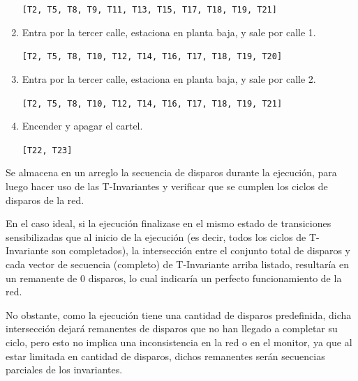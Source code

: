 \documentclass[12pt,a4paper]{article}
\begin{document}
\begin{enumerate}
    \verb|[T2, T5, T8, T9, T11, T13, T15, T17, T18, T19, T21]|
    
    \item Entra por la tercer calle, estaciona en planta baja, y sale por calle 1.
    
    \verb|[T2, T5, T8, T10, T12, T14, T16, T17, T18, T19, T20]|
    
    \item Entra por la tercer calle, estaciona en planta baja, y sale por calle 2.
    
    \verb|[T2, T5, T8, T10, T12, T14, T16, T17, T18, T19, T21]|
    
    \item Encender y apagar el cartel.
    
    \verb|[T22, T23]|
\end{enumerate}

Se almacena en un arreglo la secuencia de disparos durante la ejecución, para luego hacer uso de las T-Invariantes y verificar que se cumplen los ciclos de disparos de la red. 

En el caso ideal, si la ejecución finalizase en el mismo estado de transiciones sensibilizadas que al inicio de la ejecución (es decir, todos los ciclos de T-Invariante son completados), la intersección entre el conjunto total de disparos y cada vector de secuencia (completo) de T-Invariante arriba listado, resultaría en un remanente de 0 disparos, lo cual indicaría un perfecto funcionamiento de la red.

No obstante, como la ejecución tiene una cantidad de disparos predefinida, dicha intersección dejará remanentes de disparos que no han llegado a completar su ciclo, pero esto no implica una inconsistencia en la red o en el monitor, ya que al estar limitada en cantidad de disparos, dichos remanentes serán secuencias parciales de los invariantes.
\end{document}

